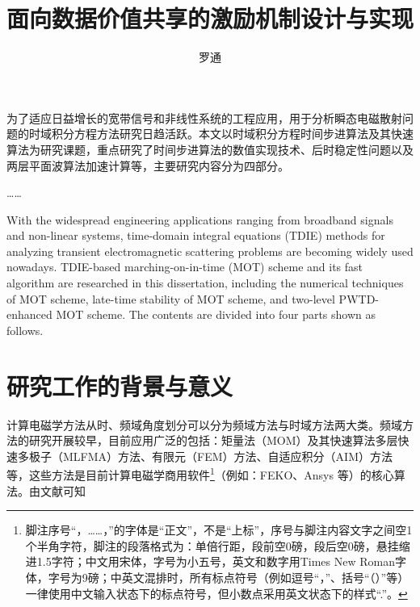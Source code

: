 \documentclass[promaster]{thesis-uestc}
\title{面向数据价值共享的激励机制设计与实现}{An Incentive Mechanism for Data Sharing}
\author{罗通}{Luo Tong}
\begin{document}
\makecover

\begin{chineseabstract}
为了适应日益增长的宽带信号和非线性系统的工程应用，用于分析瞬态电磁散射问题的时域积分方程方法研究日趋活跃。本文以时域积分方程时间步进算法及其快速算法为研究课题，重点研究了时间步进算法的数值实现技术、后时稳定性问题以及两层平面波算法加速计算等，主要研究内容分为四部分。

……

\end{chineseabstract}

\begin{englishabstract}
With the widespread engineering applications ranging from broadband signals and non-linear systems, time-domain integral equations (TDIE) methods for analyzing transient electromagnetic scattering problems are becoming widely used nowadays. TDIE-based marching-on-in-time (MOT) scheme and its fast algorithm are researched in this dissertation, including the numerical techniques of MOT scheme, late-time stability of MOT scheme, and two-level PWTD-enhanced MOT scheme. The contents are divided into four parts shown as follows.

\end{englishabstract}

\thesistableofcontents

\thesischapterexordium

\section{研究工作的背景与意义}

计算电磁学方法从时、频域角度划分可以分为频域方法与时域方法两大类。频域方法的研究开展较早，目前应用广泛的包括：矩量法（MOM）及其快速算法多层快速多极子（MLFMA）方法、有限元（FEM）方法、自适应积分（AIM）方法等，这些方法是目前计算电磁学商用软件\footnote{脚注序号“，……，”的字体是“正文”，不是“上标”，序号与脚注内容文字之间空1个半角字符，脚注的段落格式为：单倍行距，段前空0磅，段后空0磅，悬挂缩进1.5字符；中文用宋体，字号为小五号，英文和数字用Times New Roman字体，字号为9磅；中英文混排时，所有标点符号（例如逗号“，”、括号“（）”等）一律使用中文输入状态下的标点符号，但小数点采用英文状态下的样式“.”。}（例如：FEKO、Ansys 等）的核心算法。由文献\cite{feng997he,clerc2010discrete,xiao2012yi}可知
\end{document}
